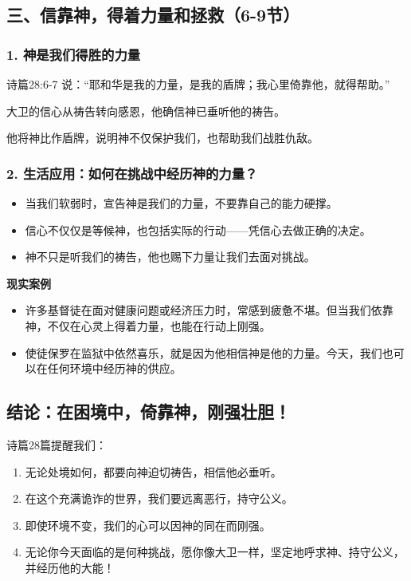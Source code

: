 \documentclass[a4paper, 12pt]{article}
\begin{document}
\subsection*{三、信靠神，得着力量和拯救（6-9节）}
\subsubsection*{1. 神是我们得胜的力量}
\hspace{0.6cm}诗篇28:6-7 说：“耶和华是我的力量，是我的盾牌；我心里倚靠他，就得帮助。”

大卫的信心从祷告转向感恩，他确信神已垂听他的祷告。

他将神比作盾牌，说明神不仅保护我们，也帮助我们战胜仇敌。
\subsubsection*{2. 生活应用：如何在挑战中经历神的力量？}
\begin{itemize}
    \item 当我们软弱时，宣告神是我们的力量，不要靠自己的能力硬撑。
    \item 信心不仅仅是等候神，也包括实际的行动——凭信心去做正确的决定。

    \item 神不只是听我们的祷告，他也赐下力量让我们去面对挑战。

\end{itemize}

\textbf{现实案例}
\begin{itemize}
    \item 许多基督徒在面对健康问题或经济压力时，常感到疲惫不堪。但当我们依靠神，不仅在心灵上得着力量，也能在行动上刚强。

    \item 使徒保罗在监狱中依然喜乐，就是因为他相信神是他的力量。今天，我们也可以在任何环境中经历神的供应。

\end{itemize}
\subsection*{结论：在困境中，倚靠神，刚强壮胆！}
诗篇28篇提醒我们：
\begin{enumerate}
    \item 无论处境如何，都要向神迫切祷告，相信他必垂听。
    \item 在这个充满诡诈的世界，我们要远离恶行，持守公义。
    \item 即使环境不变，我们的心可以因神的同在而刚强。
    \item 无论你今天面临的是何种挑战，愿你像大卫一样，坚定地呼求神、持守公义，并经历他的大能！
\end{enumerate}
\end{document}
